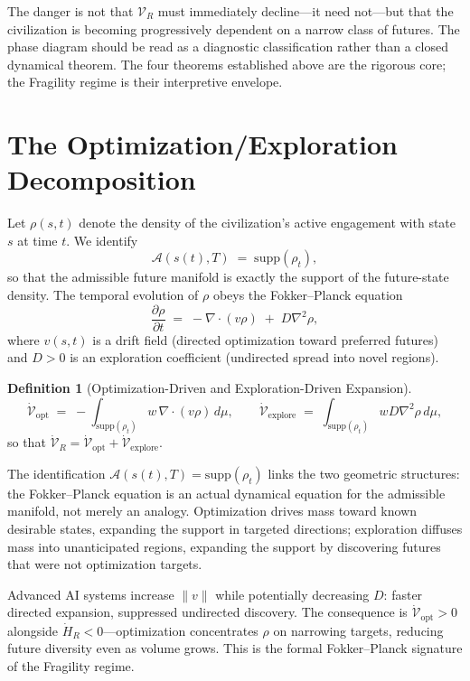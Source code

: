 \documentclass[12pt, a4paper]{article}
\theoremstyle{plain}
\theoremstyle{definition}
\newtheorem{definition}{Definition}
\theoremstyle{remark}
\begin{document}
The danger is not that $\mathcal{V}_R$ must immediately decline---it need not---but that the civilization is becoming progressively dependent on a narrow class of futures. The phase diagram should be read as a diagnostic classification rather than a closed dynamical theorem. The four theorems established above are the rigorous core; the Fragility regime is their interpretive envelope.

\section{The Optimization/Exploration Decomposition}
\label{sec:optexplore}

Let $\rho(s,t)$ denote the density of the civilization's active engagement with state $s$ at time $t$. We identify
\[
\mathcal{A}(s(t),T) \;=\; \mathrm{supp}(\rho_t),
\]
so that the admissible future manifold is exactly the support of the future-state density. The temporal evolution of $\rho$ obeys the Fokker--Planck equation
\[
\frac{\partial \rho}{\partial t} \;=\; -\nabla \cdot (v\rho) \;+\; D\nabla^2\rho,
\]
where $v(s,t)$ is a drift field (directed optimization toward preferred futures) and $D > 0$ is an exploration coefficient (undirected spread into novel regions).

\begin{definition}[Optimization-Driven and Exploration-Driven Expansion]
\[
\dot{\mathcal{V}}_{\mathrm{opt}} \;=\; -\int_{\mathrm{supp}(\rho_t)} w\, \nabla \cdot (v\rho)\, d\mu, \qquad \dot{\mathcal{V}}_{\mathrm{explore}} \;=\; \int_{\mathrm{supp}(\rho_t)} wD\nabla^2\rho\, d\mu,
\]
so that $\dot{\mathcal{V}}_R = \dot{\mathcal{V}}_{\mathrm{opt}} + \dot{\mathcal{V}}_{\mathrm{explore}}$.
\end{definition}

The identification $\mathcal{A}(s(t),T) = \mathrm{supp}(\rho_t)$ links the two geometric structures: the Fokker--Planck equation is an actual dynamical equation for the admissible manifold, not merely an analogy. Optimization drives mass toward known desirable states, expanding the support in targeted directions; exploration diffuses mass into unanticipated regions, expanding the support by discovering futures that were not optimization targets.

Advanced AI systems increase $\|v\|$ while potentially decreasing $D$: faster directed expansion, suppressed undirected discovery. The consequence is $\dot{\mathcal{V}}_{\mathrm{opt}} > 0$ alongside $\dot{H}_R < 0$---optimization concentrates $\rho$ on narrowing targets, reducing future diversity even as volume grows. This is the formal Fokker--Planck signature of the Fragility regime.
\end{document}
